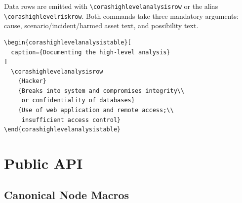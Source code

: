 \documentclass[a4paper]{article}
\begin{document}
Data rows are emitted with \texttt{\textbackslash corashighlevelanalysisrow} or
the alias \texttt{\textbackslash corashighlevelriskrow}. Both commands take
three mandatory arguments: cause, scenario/incident/harmed asset text, and
possibility text.

\begin{verbatim}
\begin{corashighlevelanalysistable}[
  caption={Documenting the high-level analysis}
]
  \corashighlevelanalysisrow
    {Hacker}
    {Breaks into system and compromises integrity\\
     or confidentiality of databases}
    {Use of web application and remote access;\\
     insufficient access control}
\end{corashighlevelanalysistable}
\end{verbatim}

\section{Public API}

\subsection{Canonical Node Macros}
\end{document}
